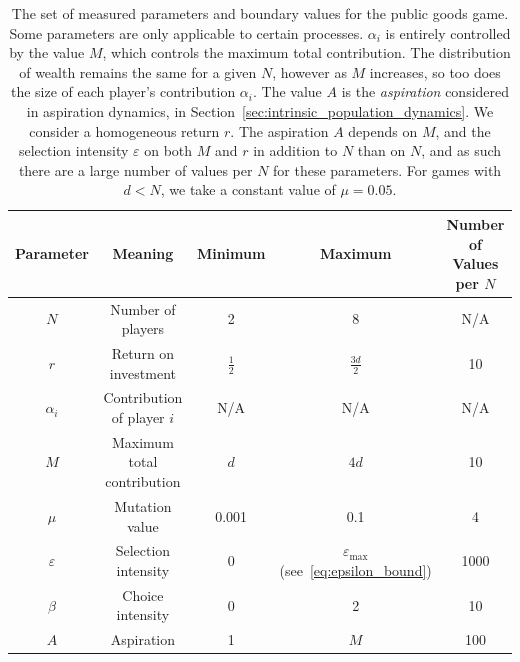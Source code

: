 \documentclass{article}
\begin{document}
\begin{table}[htbp!]
    \begin{tabular}{|c|c|c|c|c|}
        \hline
        Parameter & Meaning &Minimum & Maximum & Number of Values per \(N\)\\
        \hline
        \(N\) & Number of players &2 & 8 & N/A\\
        \hline
        \(r\) & Return on investment & \(\frac{1}{2}\) & \(\frac{3d}{2}\) & 10\\
        \hline
        \(\alpha_i\) & Contribution of player \(i\) & N/A & N/A & N/A\\
        \hline
        \(M\) & Maximum total contribution & \(d\) & \(4d\) & 10\\
        \hline
        \(\mu\) & Mutation value & 0.001 & 0.1 & 4\\
        \hline
        \(\varepsilon\) & Selection intensity & 0 & \(\varepsilon_{\max}\) (see~\eqref{eq:epsilon_bound}) & 1000\\
        \hline
        \(\beta\) & Choice intensity & 0 & 2 & 10\\
        \hline
        \(A\) & Aspiration & 1 & \(M\) & 100\\
        \hline
    \end{tabular}
    \centering
    \caption{The set of measured parameters and boundary values for the public
    goods game. Some parameters are only applicable to certain processes.
    \(\alpha_i\) is entirely controlled by the value \(M\), which controls the
    maximum total contribution. The distribution of wealth remains the same for
    a given \(N\), however as \(M\) increases, so too does the size of each
    player's contribution \(\alpha_i\). The value \(A\) is the \emph{aspiration}
    considered in aspiration dynamics, in
    Section~\ref{sec:intrinsic_population_dynamics}. We consider a homogeneous
    return \(r\). The aspiration \(A\) depends on \(M\), and the selection
    intensity \(\varepsilon\) on both \(M\) and \(r\) in addition to \(N\) than
    on \(N\), and as such there are a large number of values per \(N\) for these
    parameters. For games with \(d < N\), we take a constant value of
    \(\mu=0.05\).}
    \label{fig:parameter_sweep_table}
\end{table}
\end{document}
